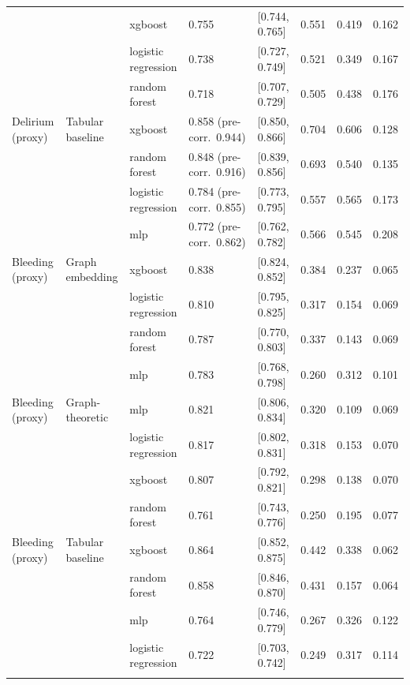 \begin{table}[t]
\begin{tabular}{llllllll}
 &  & xgboost & 0.755 & [0.744, 0.765] & 0.551 & 0.419 & 0.162 \\
 &  & logistic regression & 0.738 & [0.727, 0.749] & 0.521 & 0.349 & 0.167 \\
 &  & random forest & 0.718 & [0.707, 0.729] & 0.505 & 0.438 & 0.176 \\
Delirium (proxy) & Tabular baseline & xgboost & 0.858 (pre-corr.\ 0.944) & [0.850, 0.866] & 0.704 & 0.606 & 0.128 \\
 &  & random forest & 0.848 (pre-corr.\ 0.916) & [0.839, 0.856] & 0.693 & 0.540 & 0.135 \\
 &  & logistic regression & 0.784 (pre-corr.\ 0.855) & [0.773, 0.795] & 0.557 & 0.565 & 0.173 \\
 &  & mlp & 0.772 (pre-corr.\ 0.862) & [0.762, 0.782] & 0.566 & 0.545 & 0.208 \\
\addlinespace
Bleeding (proxy) & Graph embedding & xgboost & 0.838 & [0.824, 0.852] & 0.384 & 0.237 & 0.065 \\
 &  & logistic regression & 0.810 & [0.795, 0.825] & 0.317 & 0.154 & 0.069 \\
 &  & random forest & 0.787 & [0.770, 0.803] & 0.337 & 0.143 & 0.069 \\
 &  & mlp & 0.783 & [0.768, 0.798] & 0.260 & 0.312 & 0.101 \\
Bleeding (proxy) & Graph-theoretic & mlp & 0.821 & [0.806, 0.834] & 0.320 & 0.109 & 0.069 \\
 &  & logistic regression & 0.817 & [0.802, 0.831] & 0.318 & 0.153 & 0.070 \\
 &  & xgboost & 0.807 & [0.792, 0.821] & 0.298 & 0.138 & 0.070 \\
 &  & random forest & 0.761 & [0.743, 0.776] & 0.250 & 0.195 & 0.077 \\
Bleeding (proxy) & Tabular baseline & xgboost & 0.864 & [0.852, 0.875] & 0.442 & 0.338 & 0.062 \\
 &  & random forest & 0.858 & [0.846, 0.870] & 0.431 & 0.157 & 0.064 \\
 &  & mlp & 0.764 & [0.746, 0.779] & 0.267 & 0.326 & 0.122 \\
 &  & logistic regression & 0.722 & [0.703, 0.742] & 0.249 & 0.317 & 0.114 \\
\addlinespace
\bottomrule
\end{tabular}
\end{table}
